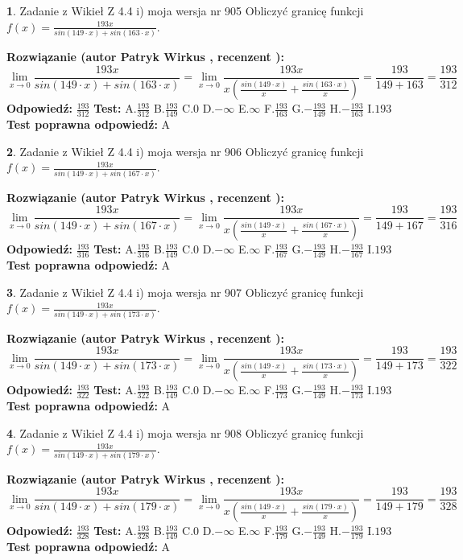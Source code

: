 \documentclass[12pt, a4paper]{article}
\theoremstyle{definition} %
\newtheorem{zad}{}
\newcommand{\zadStart}[1]{\begin{zad}#1\newline}
\newcommand{\zadStop}{\end{zad}}
\newcommand{\rozwStart}[2]{\noindent \textbf{Rozwiązanie (autor #1 , recenzent #2): }\newline}
\newcommand{\rozwStop}{\newline}
\newcommand{\odpStart}{\noindent \textbf{Odpowiedź:}\newline}
\newcommand{\odpStop}{\newline}
\newcommand{\testStart}{\noindent \textbf{Test:}\newline}
\newcommand{\testStop}{\newline}
\newcommand{\kluczStart}{\noindent \textbf{Test poprawna odpowiedź:}\newline}
\newcommand{\kluczStop}{\newline}
\begin{document}
\zadStart{Zadanie z Wikieł Z 4.4 i) moja wersja nr 905}
Obliczyć granicę funkcji $f(x)=\frac{193x}{sin(149\cdot x) +sin(163\cdot x)}$.
\zadStop
\rozwStart{Patryk Wirkus}{}
$$\lim\limits_{x\to 0}\frac{193x}{sin(149\cdot x) +sin(163\cdot x)}=\lim\limits_{x\to 0}\frac{193x}{x(\frac{sin(149\cdot x)}{x}+\frac{sin(163\cdot x)}{x})}=\frac{193}{149+163} = \frac{193}{312}$$
\rozwStop
\odpStart
$\frac{193}{312}$
\odpStop
\testStart
A.$\frac{193}{312}$
B.$\frac{193}{149}$
C.$0$
D.$-\infty$
E.$\infty$
F.$\frac{193}{163}$
G.$-\frac{193}{149}$
H.$-\frac{193}{163}$
I.$193$
\testStop
\kluczStart
A
\kluczStop



\zadStart{Zadanie z Wikieł Z 4.4 i) moja wersja nr 906}
Obliczyć granicę funkcji $f(x)=\frac{193x}{sin(149\cdot x) +sin(167\cdot x)}$.
\zadStop
\rozwStart{Patryk Wirkus}{}
$$\lim\limits_{x\to 0}\frac{193x}{sin(149\cdot x) +sin(167\cdot x)}=\lim\limits_{x\to 0}\frac{193x}{x(\frac{sin(149\cdot x)}{x}+\frac{sin(167\cdot x)}{x})}=\frac{193}{149+167} = \frac{193}{316}$$
\rozwStop
\odpStart
$\frac{193}{316}$
\odpStop
\testStart
A.$\frac{193}{316}$
B.$\frac{193}{149}$
C.$0$
D.$-\infty$
E.$\infty$
F.$\frac{193}{167}$
G.$-\frac{193}{149}$
H.$-\frac{193}{167}$
I.$193$
\testStop
\kluczStart
A
\kluczStop



\zadStart{Zadanie z Wikieł Z 4.4 i) moja wersja nr 907}
Obliczyć granicę funkcji $f(x)=\frac{193x}{sin(149\cdot x) +sin(173\cdot x)}$.
\zadStop
\rozwStart{Patryk Wirkus}{}
$$\lim\limits_{x\to 0}\frac{193x}{sin(149\cdot x) +sin(173\cdot x)}=\lim\limits_{x\to 0}\frac{193x}{x(\frac{sin(149\cdot x)}{x}+\frac{sin(173\cdot x)}{x})}=\frac{193}{149+173} = \frac{193}{322}$$
\rozwStop
\odpStart
$\frac{193}{322}$
\odpStop
\testStart
A.$\frac{193}{322}$
B.$\frac{193}{149}$
C.$0$
D.$-\infty$
E.$\infty$
F.$\frac{193}{173}$
G.$-\frac{193}{149}$
H.$-\frac{193}{173}$
I.$193$
\testStop
\kluczStart
A
\kluczStop



\zadStart{Zadanie z Wikieł Z 4.4 i) moja wersja nr 908}
Obliczyć granicę funkcji $f(x)=\frac{193x}{sin(149\cdot x) +sin(179\cdot x)}$.
\zadStop
\rozwStart{Patryk Wirkus}{}
$$\lim\limits_{x\to 0}\frac{193x}{sin(149\cdot x) +sin(179\cdot x)}=\lim\limits_{x\to 0}\frac{193x}{x(\frac{sin(149\cdot x)}{x}+\frac{sin(179\cdot x)}{x})}=\frac{193}{149+179} = \frac{193}{328}$$
\rozwStop
\odpStart
$\frac{193}{328}$
\odpStop
\testStart
A.$\frac{193}{328}$
B.$\frac{193}{149}$
C.$0$
D.$-\infty$
E.$\infty$
F.$\frac{193}{179}$
G.$-\frac{193}{149}$
H.$-\frac{193}{179}$
I.$193$
\testStop
\kluczStart
A
\kluczStop
\end{document}
